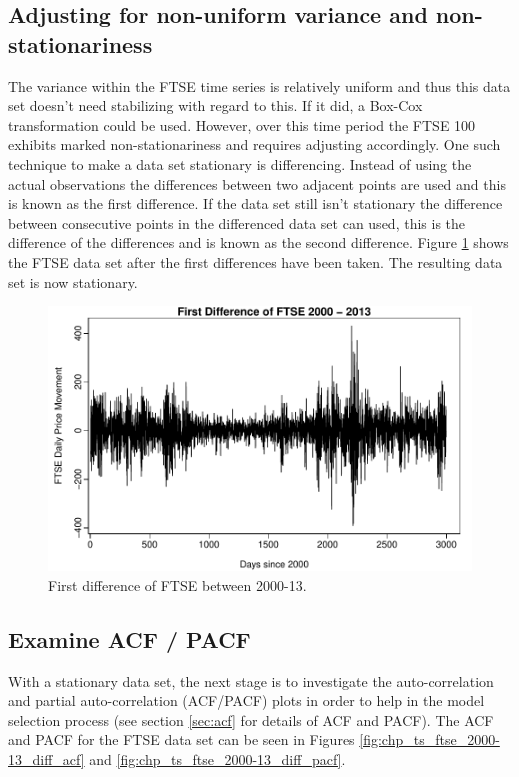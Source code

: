 \subsection{Adjusting for non-uniform variance and non-stationariness}
The variance within the FTSE time series is relatively uniform and thus this data set doesn't need stabilizing with regard to this. If it did, a Box-Cox transformation could be used. However, over this time period the FTSE 100 exhibits marked non-stationariness and requires adjusting accordingly. One such technique to make a data set stationary is differencing. Instead of using the actual observations the differences between two adjacent points are used and this is known as the first difference. If the data set still isn't stationary the difference between consecutive points in the differenced data set can used, this is the difference of the differences and is known as the second difference. Figure \ref{fig:chp_ts_ftse_2000_13_diff} shows the FTSE data set after the first differences have been taken.  The resulting data set is now stationary.

\begin{figure}[tbh]
\centering
\includegraphics{Figures/chp_ts_ftse_2000-13_diff}
\caption[First difference of FTSE]{First difference of FTSE between 2000-13.}
\label{fig:chp_ts_ftse_2000_13_diff}
\end{figure}

\subsection{Examine ACF / PACF}
With a stationary data set, the next stage is to investigate the auto-correlation and partial auto-correlation (ACF/PACF) plots in order to help in the model selection process (see section \ref{sec:acf} for details of ACF and PACF). The ACF and PACF for the FTSE data set can be seen in Figures \ref{fig:chp_ts_ftse_2000-13_diff_acf} and \ref{fig:chp_ts_ftse_2000-13_diff_pacf}. 

